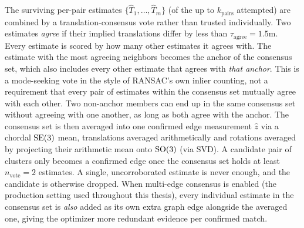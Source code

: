 The surviving per-pair estimates $\{\hat{T}_1, \dots, \hat{T}_m\}$ (of the up to
$k_{\mathrm{pairs}}$ attempted) are combined by a translation-consensus vote rather than
trusted individually. Two estimates \emph{agree} if their implied translations differ by less
than $\tau_{\mathrm{agree}} = 1.5$m. Every estimate is scored by how many other estimates it
agrees with. The estimate with the most agreeing neighbors becomes the anchor of the consensus
set, which also includes every other estimate that agrees with \emph{that anchor}. This is a
mode-seeking vote in the style of RANSAC's own inlier counting, not a requirement that every
pair of estimates within the consensus set mutually agree with each other. Two non-anchor
members can end up in the same consensus set without agreeing with one another, as long as both
agree with the anchor. The consensus set is then averaged into one confirmed edge measurement
$\hat{z}$ via a chordal $\mathrm{SE}(3)$ mean, translations averaged arithmetically and rotations averaged
by projecting their arithmetic mean onto $\mathrm{SO}(3)$ (via SVD). A candidate pair of clusters only
becomes a confirmed edge once the consensus set holds at least $n_{\mathrm{vote}} = 2$
estimates. A single, uncorroborated estimate is never enough, and the candidate is otherwise
dropped. When multi-edge consensus is enabled (the production setting used throughout this
thesis), every individual estimate in the consensus set is \emph{also} added as its own extra
graph edge alongside the averaged one, giving the optimizer more redundant evidence per
confirmed match.

